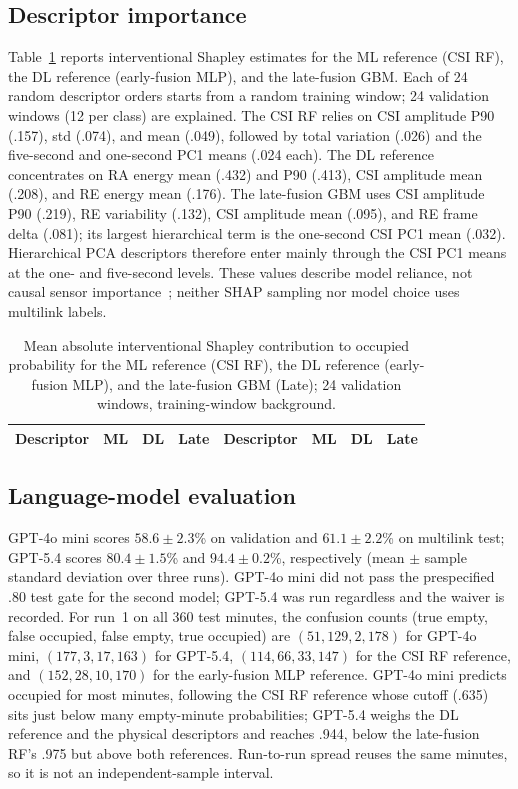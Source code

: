 \documentclass[conference,10pt,letterpaper]{IEEEtran}
\begin{document}
\subsection{Descriptor importance}
Table~\ref{tab:shap} reports interventional Shapley estimates for the ML reference (CSI RF), the DL reference (early-fusion MLP), and the late-fusion GBM. Each of 24 random descriptor orders starts from a random training window; 24 validation windows (12 per class) are explained. The CSI RF relies on CSI amplitude P90 (.157), std (.074), and mean (.049), followed by total variation (.026) and the five-second and one-second PC1 means (.024 each). The DL reference concentrates on RA energy mean (.432) and P90 (.413), CSI amplitude mean (.208), and RE energy mean (.176). The late-fusion GBM uses CSI amplitude P90 (.219), RE variability (.132), CSI amplitude mean (.095), and RE frame delta (.081); its largest hierarchical term is the one-second CSI PC1 mean (.032). Hierarchical PCA descriptors therefore enter mainly through the CSI PC1 means at the one- and five-second levels. These values describe model reliance, not causal sensor importance~\cite{shap}; neither SHAP sampling nor model choice uses multilink labels.

\begin{table}[!t]
\centering\scriptsize\setlength{\tabcolsep}{2pt}
\caption{Mean absolute interventional Shapley contribution to occupied probability for the ML reference (CSI RF), the DL reference (early-fusion MLP), and the late-fusion GBM (Late); 24 validation windows, training-window background.}
\label{tab:shap}
\begin{tabular}{@{}llllllll@{}}
\toprule
Descriptor & ML & DL & Late & Descriptor & ML & DL & Late\\
\midrule

\end{tabular}
\end{table}

\subsection{Language-model evaluation}
GPT-4o mini scores $58.6\pm2.3$\% on validation and $61.1\pm2.2$\% on multilink test; GPT-5.4 scores $80.4\pm1.5$\% and $94.4\pm0.2$\%, respectively (mean $\pm$ sample standard deviation over three runs). GPT-4o mini did not pass the prespecified .80 test gate for the second model; GPT-5.4 was run regardless and the waiver is recorded. For run~1 on all 360 test minutes, the confusion counts (true empty, false occupied, false empty, true occupied) are $(51,129,2,178)$ for GPT-4o mini, $(177,3,17,163)$ for GPT-5.4, $(114,66,33,147)$ for the CSI RF reference, and $(152,28,10,170)$ for the early-fusion MLP reference. GPT-4o mini predicts occupied for most minutes, following the CSI RF reference whose cutoff (.635) sits just below many empty-minute probabilities; GPT-5.4 weighs the DL reference and the physical descriptors and reaches .944, below the late-fusion RF's .975 but above both references. Run-to-run spread reuses the same minutes, so it is not an independent-sample interval.
\end{document}
